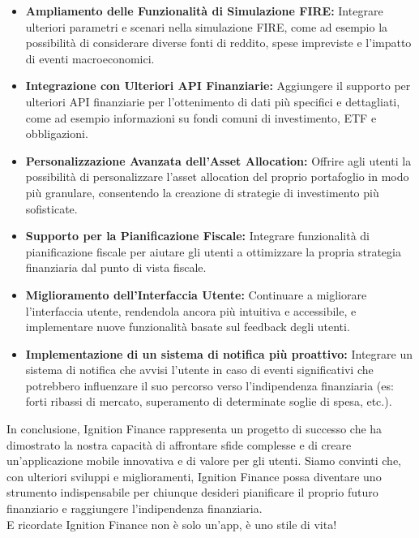 \begin{itemize}
    \item \textbf{Ampliamento delle Funzionalità di Simulazione FIRE:} Integrare
    ulteriori parametri e scenari nella simulazione FIRE, come ad esempio la
    possibilità di considerare diverse fonti di reddito, spese impreviste e
    l'impatto di eventi macroeconomici.
    \item \textbf{Integrazione con Ulteriori API Finanziarie:}  Aggiungere il
    supporto per ulteriori API finanziarie per l'ottenimento di dati più
    specifici e dettagliati, come ad esempio informazioni su fondi comuni di
    investimento, ETF e obbligazioni.
    \item \textbf{Personalizzazione Avanzata dell'Asset Allocation:} Offrire
    agli utenti la possibilità di personalizzare l'asset allocation del proprio
    portafoglio in modo più granulare, consentendo la creazione di strategie di
    investimento più sofisticate.
    \item \textbf{Supporto per la Pianificazione Fiscale:} Integrare
    funzionalità di pianificazione fiscale per aiutare gli utenti a ottimizzare
    la propria strategia finanziaria dal punto di vista fiscale.
    \item \textbf{Miglioramento dell'Interfaccia Utente:} Continuare a
    migliorare l'interfaccia utente, rendendola ancora più intuitiva e
    accessibile, e implementare nuove funzionalità basate sul feedback degli
    utenti.
    \item \textbf{Implementazione di un sistema di notifica più proattivo:}
    Integrare un sistema di notifica che avvisi l'utente in caso di eventi
    significativi che potrebbero influenzare il suo percorso verso
    l'indipendenza finanziaria (es: forti ribassi di mercato, superamento di
    determinate soglie di spesa, etc.).
\end{itemize}

In conclusione, Ignition Finance rappresenta un progetto di successo che ha
dimostrato la nostra capacità di affrontare sfide complesse e di creare
un'applicazione mobile innovativa e di valore per gli utenti.
Siamo convinti
che, con ulteriori sviluppi e miglioramenti, Ignition Finance possa diventare
uno strumento indispensabile per chiunque desideri pianificare il proprio futuro
finanziario e raggiungere l'indipendenza finanziaria.\\
E ricordate Ignition Finance non è solo un'app, è uno stile di vita!